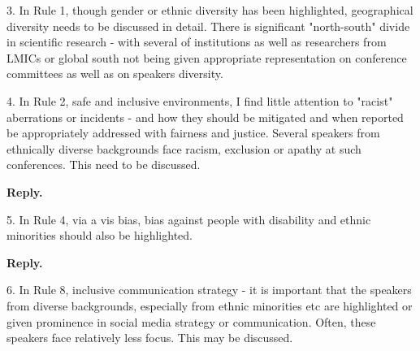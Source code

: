 \documentclass{article}
\newenvironment{Reply}{\noindent\color{BlueViolet}\textbf{Reply.}}{\vspace{1em}}
\begin{document}
3. In Rule 1, though gender or ethnic diversity has been highlighted, geographical diversity needs to be discussed in detail. There is significant "north-south" divide in scientific research - with several of institutions as well as researchers from LMICs or global south not being given appropriate representation on conference committees as well as on speakers diversity.


4. In Rule 2, safe and inclusive environments, I find little attention to "racist" aberrations or incidents - and how they should be mitigated and when reported be appropriately addressed with fairness and justice.
Several speakers from ethnically diverse backgrounds face racism, exclusion or apathy at such conferences. This need to be discussed.

\begin{Reply}



\end{Reply}

5. In Rule 4, via a vis bias, bias against people with disability and ethnic minorities should also be highlighted.

\begin{Reply}
\end{Reply}

6. In Rule 8, inclusive communication strategy - it is important that the speakers from diverse backgrounds, especially from ethnic minorities etc are highlighted or given prominence in social media strategy or communication. Often, these speakers face relatively less focus. This may be discussed.
\end{document}
